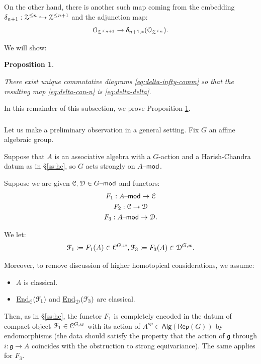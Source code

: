 \documentclass[reqno,11pt]{amsart}
\numberwithin{equation}{subsection}
\newtheorem{prop}[thm]{Proposition}
\theoremstyle{remark}
\newcommand{\into}{\hookrightarrow}
\newcommand{\sC}{{\EuScript C}}
\newcommand{\sD}{{\EuScript D}}
\newcommand{\sF}{{\EuScript F}}
\newcommand{\sO}{{\EuScript O}}
\newcommand{\sZ}{{\EuScript Z}}
\newcommand{\fg}{{\mathfrak g}}
\newcommand{\on}{\operatorname}
\newcommand{\ul}{\underline}
\newcommand{\mathendash}{\text{\textendash}}
\newcommand{\End}{\on{End}}
\newcommand{\Rep}{\mathsf{Rep}}
\renewcommand{\mod}{\mathendash\mathsf{mod}}
\newcommand{\Alg}{\mathsf{Alg}}
\begin{document}
On the other hand, there is another such map coming from the embedding
$\delta_{n+1}:\sZ^{\leq n} \into \sZ^{\leq n+1}$ and the adjunction map:
%
\begin{equation}\label{eq:delta-delta}
\sO_{\sZ^{\leq n+1}} \to \delta_{n+1,*}(\sO_{\sZ^{\leq n}}).
\end{equation}

We will show:

\begin{prop}\label{p:delta-infty-comm}

There exist unique commutative diagrams \eqref{eq:delta-infty-comm}
so that the resulting map \eqref{eq:delta-can-n} is \eqref{eq:delta-delta}.

\end{prop}

In this remainder of this subsection, we prove Proposition \ref{p:delta-infty-comm}.

\subsubsection{}\label{sss:hc-comm-diags}

Let us make a preliminary observation in a general setting. Fix $G$
an affine algebraic group.

Suppose that $A$ is an associative algebra with a 
$G$-action and a Harish-Chandra datum as in \S \ref{ss:hc}, so 
$G$ acts strongly on $A\mod$.

Suppose we are given $\sC,\sD \in G\mod$ and functors:
%
\[
\begin{gathered}
F_1:A\mod \to \sC \\
F_2:\sC \to \sD \\
F_3:A \mod \to \sD.
\end{gathered}
\]

We let:
%
\[
\sF_1 \coloneqq F_1(A) \in \sC^{G,w}, \sF_3 \coloneqq F_3(A) \in \sD^{G,w}.
\]

Moreover, to remove discussion of higher homotopical considerations,
we assume:

\begin{itemize}

\item $A$ is classical.

\item $\ul{\End}_{\sC}(\sF_1)$ and $\ul{\End}_{\sD}(\sF_3)$ are classical.

\end{itemize}

Then, as in \S \ref{ss:hc}, the 
functor $F_1$ is completely encoded in the datum of compact
object $\sF_1 \in \sC^{G,w}$ with its action of $A^{op} \in \Alg(\Rep(G))$ by 
endomorphisms (the data should satisfy the property that the action of
$\fg$ through $i:\fg \to A$ coincides with the obstruction to strong equivariance).
The same applies for $F_3$.
\end{document}
